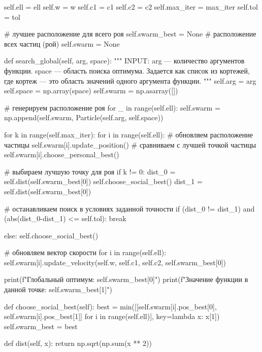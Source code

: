 \begin{pyprint}
    self.ell = ell
    self.w = w
    self.c1 = c1
    self.c2 = c2
    self.max_iter = max_iter
    self.tol = tol

    # лучшее расположение для всего роя
    self.swarm_best = None
    # расположение всех частиц (рой)
    self.swarm = None

  def search_global(self, arg, space):
    """
    INPUT:
    arg --- количество аргументов функции.
    space --- область поиска оптимума. Задается как список из
    кортежей, где кортеж --- это область значений
    одного аргумента функции.
    """
    self.arg = arg
    self.space = np.array(space)
    self.swarm = np.asarray([])

    # генерируем расположение роя
    for _ in range(self.ell):
       self.swarm = np.append(self.swarm,
                              Particle(self.arg, self.space))

    for k in range(self.max_iter):
       for i in range(self.ell):
          # обновляем расположение частицы
          self.swarm[i].update_position()
          # сравниваем с лучшей точкой частицы
          self.swarm[i].choose_personal_best()

       # выбираем лучшую точку для роя
       if k != 0:
          dist_0 = self.dist(self.swarm_best[0])
          self.choose_social_best()
          dist_1 = self.dist(self.swarm_best[0])

          # останавливаем поиск в условиях заданной точности
          if (dist_0 != dist_1) and (abs(dist_0-dist_1) <= self.tol):
             break
\end{pyprint}

\begin{pyprint}
          else:
             self.choose_social_best()

       # обновляем вектор скорости
       for i in range(self.ell):
          self.swarm[i].update_velocity(self.w, self.c1,
                                        self.c2, self.swarm_best[0])

    print(f"Глобальный оптимум: {self.swarm_best[0]}")
    print(f"Значение функции в данной точке: {self.swarm_best[1]}")

  def choose_social_best(self):
    best = min([[self.swarm[i].pos_best[0],
                 self.swarm[i].pos_best[1]] for i in range(self.ell)],
                 key=lambda x: x[1])
    self.swarm_best = best

  def dist(self, x):
    return np.sqrt(np.sum(x ** 2))
\end{pyprint}


